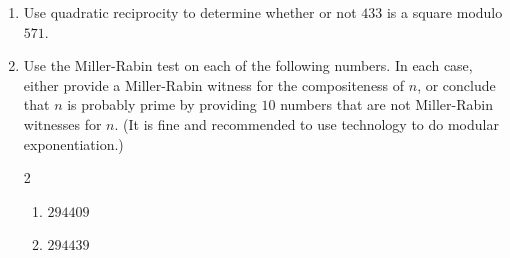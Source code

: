\documentclass[12pt]{article}
\begin{document}
\begin{enumerate}
\item Use quadratic reciprocity to determine whether or not $433$ is a square modulo $571$. 


\item Use the Miller-Rabin test on each of the following numbers.  In each case, either provide a Miller-Rabin witness for the compositeness of $n$, or conclude that $n$ is probably prime by providing $10$ numbers that are not Miller-Rabin witnesses for $n$.  (It is fine and recommended to use technology to do modular exponentiation.)
\begin{multicols}{2}
\begin{enumerate}
\item $294409$
\item $294439$
\end{enumerate}
\end{multicols}
\end{enumerate}
\end{document}
